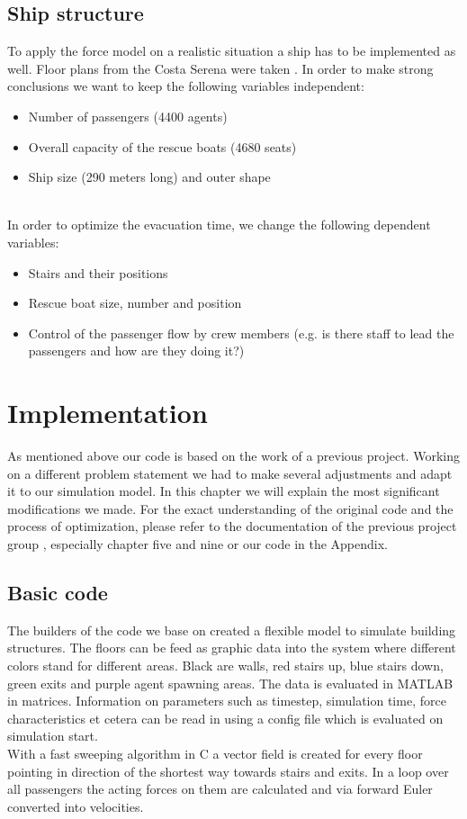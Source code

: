\documentclass[11pt]{article}
\begin{document}
\subsection{Ship structure}
To apply the force model on a realistic situation a ship has to be implemented as well. Floor plans from the Costa Serena were taken \cite{shipdecks}. In order to make strong conclusions we want to keep the following variables independent:

\begin{itemize}
\item Number of passengers (4400 agents)
\item Overall capacity of the rescue boats (4680 seats)
\item Ship size (290 meters long) and outer shape \\\\
\end{itemize}

In order to optimize the evacuation time, we change the following dependent variables:
\begin{itemize}
\item Stairs and their positions
\item Rescue boat size, number and position
\item Control of the passenger flow by crew members (e.g. is there staff to lead the passengers and how are they doing it?)
\end{itemize}


\newpage
\section{Implementation}
As mentioned above our code is based on the work of a previous project. Working on a different problem statement we had to make several adjustments and adapt it to our simulation model. In this chapter we will explain the most significant modifications we made. For the exact understanding of the original code and the process of optimization, please refer to the documentation of the previous project group \cite{Building}, especially chapter five and nine or our code in the Appendix.

\subsection{Basic code}
The builders of the code we base on created a flexible model to simulate building structures. The floors can be feed as graphic data into the system where different colors stand for different areas. Black are walls, red stairs up, blue stairs down, green exits and purple agent spawning areas. The data is evaluated in MATLAB in matrices. Information on parameters such as timestep, simulation time, force characteristics et cetera can be read in using a config file which is evaluated on simulation start.\\
With a fast sweeping algorithm in C a vector field is created for every floor pointing in direction of the shortest way towards stairs and exits. In a loop over all passengers the acting forces on them are calculated and via forward Euler converted into velocities. 
\end{document}
